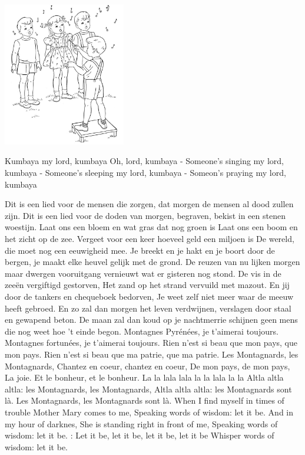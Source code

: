 \documentclass{article}
\begin{document}
\begin{songs}{}
\endverse
\endsong
\begin{intersong}
    \includegraphics[width=0.4\textwidth]{kumbayamylord}
\end{intersong}
\beginverse*
Kumbaya my lord, kumbaya 
Oh, lord, kumbaya 
\endverse
\beginchorus
-	Someone’s singing my lord, kumbaya 
-	Someone’s sleeping my lord, kumbaya	
-	Someon’s praying my lord, kumbaya	

\endchorus
\endsong 
{}
\beginverse
Dit is een lied voor de mensen die zorgen,
dat morgen de mensen al dood zullen zijn.
Dit is een lied voor de doden van morgen,
begraven, bekist in een stenen woestijn. 
\endverse
\beginchorus
Laat ons een bloem en wat gras dat nog groen is
Laat ons een boom en het zicht op de zee.
Vergeet voor een keer hoeveel geld een miljoen is
De wereld, die moet nog een eeuwigheid mee. 
\endchorus
\beginverse
Je breekt en je hakt en je boort door de bergen,
je maakt elke heuvel gelijk met de grond.
De reuzen van nu lijken morgen maar dwergen
vooruitgang vernieuwt wat er gisteren nog stond. 
\endverse
\beginverse
De vis in de zeeën vergiftigd gestorven,
Het zand op het strand vervuild met mazout. 
En jij door de tankers en chequeboek bedorven,
Je weet zelf niet meer waar de meeuw heeft gebroed. 
\endverse
\beginverse
En zo zal dan morgen het leven verdwijnen,
verslagen door staal en gewapend beton.
De maan zal dan koud op je nachtmerrie schijnen
geen mens die nog weet hoe 't einde begon. 
\endverse
\endsong
{}
\beginverse
Montagnes Pyrénées, je t’aimerai toujours.
Montagnes fortunées, je t’aimerai toujours.
Rien n’est si beau que mon pays, que mon pays.
Rien n’est si beau que ma patrie, que ma patrie. 
Les Montagnards, les Montagnards,
Chantez en coeur, chantez en coeur,
De mon pays, de mon pays, 
La joie. Et le bonheur, et le bonheur.
La la lala lala la la lala la la
\endverse
\beginchorus
Altla altla altla: les Montagnards, les Montagnards,
Altla altla altla: les Montagnards sont là.
Les Montagnards, les Montagnards sont là.
\endchorus
\endsong
{}
\beginverse
When I find myself in times of trouble
Mother Mary comes to me,
Speaking words of wisdom: let it be. 
And in my hour of darknes,
She is standing right in front of me,
Speaking words of wisdom: let it be. 
\endverse
{}:
Let it be, let it be, let it be, let it be
Whisper words of wisdom: let it be.


\end{songs}
\end{document}
